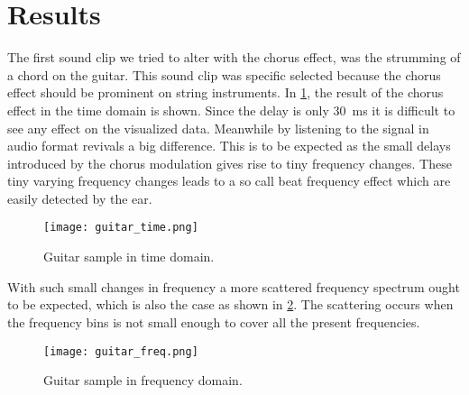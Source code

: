 \clearpage

\section{Results}
The first sound clip we tried to alter with the chorus effect, was the strumming of a chord on the guitar. This sound clip was specific selected because the chorus effect should be prominent on string instruments. 
In \cref{fig:guitar_time}, the result of the chorus effect in the time domain is shown. Since the delay is only \SI{30}{\milli\second} it is difficult to see any effect on the visualized data. Meanwhile by listening to the signal in audio format revivals a big difference. This is to be expected as the small delays introduced by the chorus modulation gives rise to tiny frequency changes. These tiny varying frequency changes leads to a so call beat frequency effect which are easily detected by the ear.

\begin{figure}[H]
	\centering
	\texttt{[image: guitar\_time.png]}
	\caption{Guitar sample in time domain.}
	\label{fig:guitar_time}
\end{figure}



With such small changes in frequency a more scattered frequency spectrum ought to be expected, which is also the case as shown in \cref{fig:guitar_freq}. The scattering occurs when the frequency bins is not small enough to cover all the present frequencies.
   
\begin{figure}[H]
	\centering
	\texttt{[image: guitar\_freq.png]}
	\caption{Guitar sample in frequency domain.}
	\label{fig:guitar_freq}
\end{figure}






